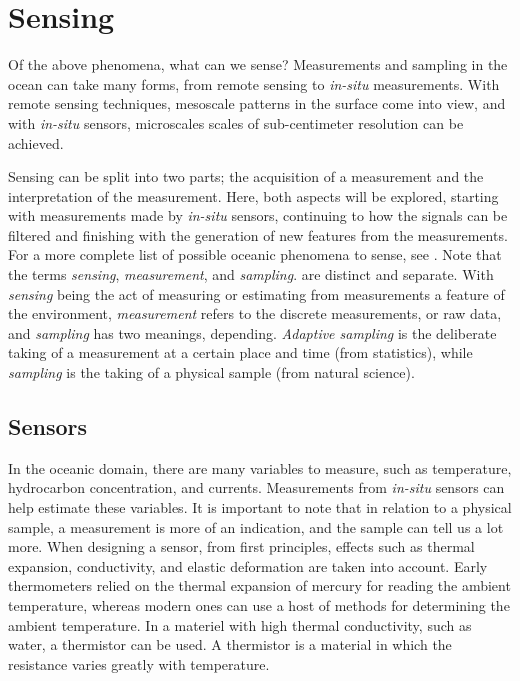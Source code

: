 \section{Sensing}
Of the above phenomena, what can we sense? Measurements and sampling in the ocean can take many forms, from remote sensing to \textit{in-situ} measurements. With remote sensing techniques, mesoscale patterns in the surface come into view, and with \textit{in-situ} sensors, microscales scales of sub-centimeter resolution can be achieved\cite{davies2017use}. 

Sensing can be split into two parts; the acquisition of a measurement and the interpretation of the measurement. Here, both aspects will be explored, starting with measurements made by \textit{in-situ} sensors, continuing to how the signals can be filtered and finishing with the generation of new features from the measurements. For a more complete list of possible oceanic phenomena to sense, see \textcite{hwang2019auv}. Note that the terms \textit{sensing}, \textit{measurement}, and \textit{sampling}. are distinct and separate. With \textit{sensing} being the act of measuring or estimating from measurements a feature of the environment, \textit{measurement} refers to the discrete measurements, or raw data, and \textit{sampling} has two meanings, depending. \textit{Adaptive sampling} is the deliberate taking of a measurement at a certain place and time (from statistics), while \textit{sampling} is the taking of a physical sample (from natural science). 

\subsection{Sensors}
In the oceanic domain, there are many variables to measure, such as temperature, hydrocarbon concentration, and currents. Measurements from \textit{in-situ} sensors can help estimate these variables. It is important to note that in relation to a physical sample, a measurement is more of an indication, and the sample can tell us a lot more. When designing a sensor, from first principles, effects such as thermal expansion, conductivity, and elastic deformation are taken into account. Early thermometers relied on the thermal expansion of mercury for reading the ambient temperature, whereas modern ones can use a host of methods for determining the ambient temperature. In a materiel with high thermal conductivity, such as water, a thermistor can be used. A thermistor is a material in which the resistance varies greatly with temperature. 


